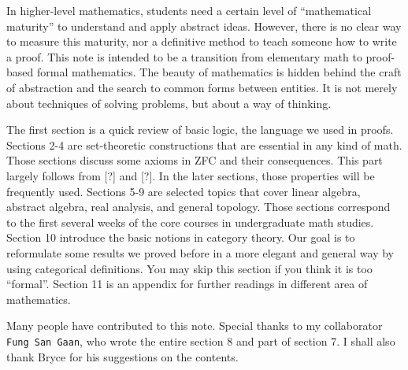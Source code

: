 \documentclass[10pt]{article}
\begin{document}
\hstart
\par
In higher-level mathematics, students need a certain level of ``mathematical maturity'' to understand and apply abstract ideas. However, there is no clear way to measure this maturity, nor a definitive method to teach someone how to write a proof. This note is intended to be a transition from elementary math to proof-based formal mathematics. The beauty of mathematics is hidden behind the craft of abstraction and  the search to common forms between entities. It is not merely about techniques of solving problems, but about a way of thinking.
\par
The first section is a quick review of basic logic, the language we used in proofs. Sections 2-4 are set-theoretic constructions that are essential in any kind of math. Those sections discuss some axioms in ZFC and their consequences. This part largely follows from [?] and [?]. In the later sections, those properties will be frequently used. Sections 5-9 are selected topics that cover linear algebra, abstract algebra, real analysis, and general topology. Those sections correspond to the first several weeks of the core courses in undergraduate math studies. Section 10 introduce the basic notions in category theory. Our goal is to reformulate some results we proved before in a more elegant and general way by using categorical definitions. You may skip this section if you think it is too ``formal''. Section 11 is an appendix for further readings in different area of mathematics. 
\par
Many people have contributed to this note. Special thanks to my collaborator \texttt{Fung San Gaan}, who wrote the entire section 8 and part of section 7. I shall also thank Bryce for his suggestions on the contents.
\end{document}
